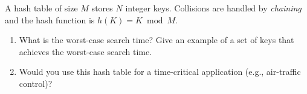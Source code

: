 A hash table of size $M$ stores $N$ integer keys.  Collisions are
handled by {\em chaining} and the hash function is $h(K) = K \bmod  M$.

\begin{enumerate}

\item  What is the worst-case search time?  Give an example of a set of
keys that achieves the worst-case search time.

\item  Would you use this hash table for a time-critical application (e.g.,
air-traffic control)?

\end{enumerate}
